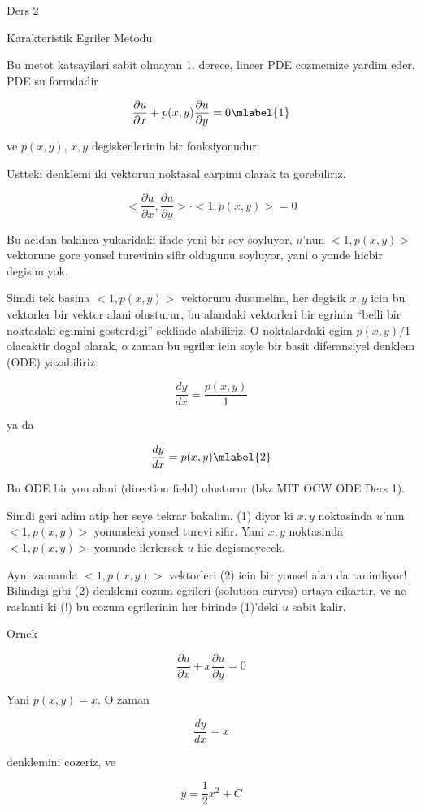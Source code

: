 \documentclass[12pt,fleqn]{article}\usepackage{../common}
\begin{document}
Ders 2

Karakteristik Egriler Metodu

Bu metot katsayilari sabit olmayan 1. derece, lineer PDE cozmemize yardim
eder. PDE su formdadir

\[ \frac{\partial u}{\partial x} + 
p(x,y) \frac{\partial u}{\partial y} = 0 
\mlabel{1}
 \]

ve $p(x,y)$, $x,y$ degiskenlerinin bir fonksiyonudur. 

Ustteki denklemi iki vektorun noktasal carpimi olarak ta gorebiliriz. 

\[ 
<\frac{\partial u}{\partial x}, \frac{\partial u}{\partial y}> \cdot 
<1,p(x,y)> = 0
 \]

Bu acidan bakinca yukaridaki ifade yeni bir sey soyluyor, $u$'nun
$<1,p(x,y)>$ vektorune gore yonsel turevinin sifir oldugunu soyluyor, yani
o yonde hicbir degisim yok. 

Simdi tek basina $<1,p(x,y)>$ vektorunu dusunelim, her degisik $x,y$ icin
bu vektorler bir vektor alani olusturur, bu alandaki vektorleri bir egrinin
``belli bir noktadaki egimini gosterdigi'' seklinde alabiliriz. O
noktalardaki egim $p(x,y) / 1$ olacaktir dogal olarak, o zaman bu egriler
icin soyle bir basit diferansiyel denklem (ODE) yazabiliriz.

\[ \frac{dy}{dx} = \frac{p(x,y)}{1} \]

ya da

\[ \frac{dy}{dx} = p(x,y) 
\mlabel{2}
\]

Bu ODE bir yon alani (direction field) olusturur (bkz MIT OCW ODE Ders 1).

Simdi geri adim atip her seye tekrar bakalim. (1) diyor ki $x,y$ noktasinda
$u$'nun $<1,p(x,y)>$ yonundeki yonsel turevi sifir. Yani $x,y$ noktasinda
$<1,p(x,y)>$ yonunde ilerlersek $u$ hic degismeyecek. 

Ayni zamanda $<1,p(x,y)>$ vektorleri (2) icin bir yonsel alan da
tanimliyor!  Bilindigi gibi (2) denklemi cozum egrileri (solution curves)
ortaya cikartir, ve ne raslanti ki (!) bu cozum egrilerinin her birinde
(1)'deki $u$ sabit kalir. 

Ornek 

\[ \frac{\partial u}{\partial x} + 
x \frac{\partial u}{\partial y} = 0 
 \]

Yani $p(x,y) = x$. O zaman 

\[ \frac{dy}{dx} = x \]

denklemini cozeriz, ve 

\[ y = \frac{1}{2}x^2 + C \]
\end{document}
